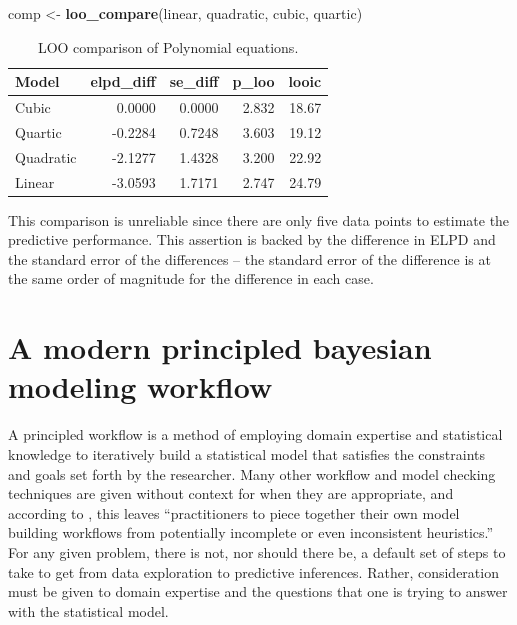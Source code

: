 \documentclass[11pt, oneside, openany]{scrbook}
\newenvironment{Shaded}{\begin{snugshade}}{\end{snugshade}}
\newcommand{\KeywordTok}[1]{\textcolor[rgb]{0.13,0.29,0.53}{\textbf{#1}}}
\newcommand{\NormalTok}[1]{#1}
\newcommand{\StringTok}[1]{\textcolor[rgb]{0.31,0.60,0.02}{#1}}
\begin{document}
\begin{Shaded}
\begin{Highlighting}[]
\NormalTok{comp <-}\StringTok{ }\KeywordTok{loo_compare}\NormalTok{(linear, quadratic, cubic, quartic)}
\end{Highlighting}
\end{Shaded}

\begin{table}[!h]

\caption{\label{tab:ch030-Galaxy-Itchy}LOO comparison of Polynomial equations.}
\centering
\begin{tabular}[t]{lrrrr}
\toprule
Model & elpd\_diff & se\_diff & p\_loo & looic\\
\midrule
Cubic & 0.0000 & 0.0000 & 2.832 & 18.67\\
Quartic & -0.2284 & 0.7248 & 3.603 & 19.12\\
Quadratic & -2.1277 & 1.4328 & 3.200 & 22.92\\
Linear & -3.0593 & 1.7171 & 2.747 & 24.79\\
\bottomrule
\end{tabular}
\end{table}

This comparison is unreliable since there are only five data points to estimate the predictive performance. This assertion is backed by the difference in ELPD and the standard error of the differences -- the standard error of the difference is at the same order of magnitude for the difference in each case.

\hypertarget{a-modern-principled-bayesian-modeling-workflow}{%
\section{A modern principled bayesian modeling workflow}\label{a-modern-principled-bayesian-modeling-workflow}}

A principled workflow is a method of employing domain expertise and statistical knowledge to iteratively build a statistical model that satisfies the constraints and goals set forth by the researcher. Many other workflow and model checking techniques are given without context for when they are appropriate, and according to \citet{betancourt2020}, this leaves ``practitioners to piece together their own model building workflows from potentially incomplete or even inconsistent heuristics.'' For any given problem, there is not, nor should there be, a default set of steps to take to get from data exploration to predictive inferences. Rather, consideration must be given to domain expertise and the questions that one is trying to answer with the statistical model.
\end{document}
